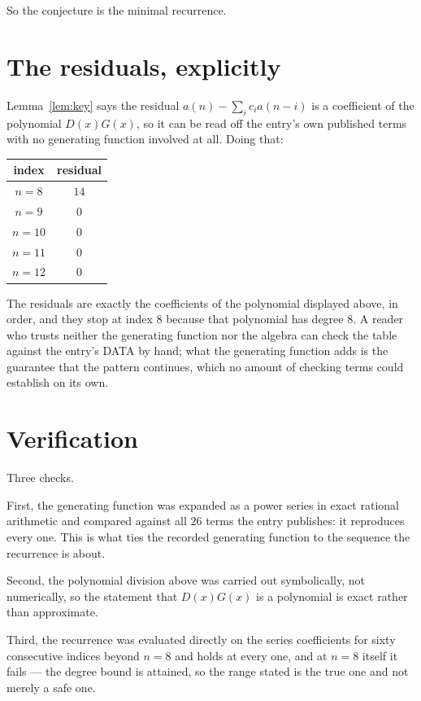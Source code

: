 \documentclass[11pt,a4paper]{article}
\theoremstyle{plain}
\theoremstyle{definition}
\begin{document}
So the conjecture is the minimal recurrence.

\section{The residuals, explicitly}

Lemma~\ref{lem:key} says the residual $a(n)-\sum_ic_ia(n-i)$ is a coefficient of the
polynomial $D(x)G(x)$, so it can be read off the entry's own published terms with no
generating function involved at all. Doing that:
\begin{center}
\begin{tabular}{cc}
index & residual \\ \hline
$n=8$ & $14$ \\
$n=9$ & $0$ \\
$n=10$ & $0$ \\
$n=11$ & $0$ \\
$n=12$ & $0$
\end{tabular}
\end{center}
The residuals are exactly the coefficients of the polynomial displayed above, in order, and
they stop at index $8$ because that polynomial has degree $8$. A reader who trusts
neither the generating function nor the algebra can check the table against the entry's DATA
by hand; what the generating function adds is the guarantee that the pattern continues, which
no amount of checking terms could establish on its own.

\section{Verification}

Three checks.

First, the generating function was expanded as a power series in exact rational arithmetic and
compared against all $26$ terms the entry publishes: it reproduces every one. This is
what ties the recorded generating function to the sequence the recurrence is about.

Second, the polynomial division above was carried out symbolically, not numerically, so the
statement that $D(x)G(x)$ is a polynomial is exact rather than approximate.

Third, the recurrence was evaluated directly on the series coefficients for sixty consecutive
indices beyond $n=8$ and holds at every one, and at $n=8$ itself it fails --- the
degree bound is attained, so the range stated is the true one and not merely a safe one.
\end{document}
